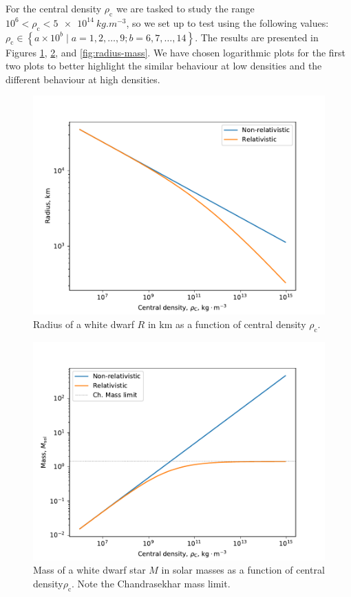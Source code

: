 \documentclass[]{article}
\newcommand{\rhoCentre}{\rho_\mathrm{c}}
\begin{document}
	For the central density $\rhoCentre$ we are tasked to study the range $10^6 < \rhoCentre < \SI{5e14}{kg.m^{-3}}$, so we set up to test using the following values: $\rhoCentre \in \left\{a \times 10^b \mid a = 1,2,\ldots,9 ; b = 6,7, \ldots, 14\right\}$. The results are presented in Figures \ref{fig:radius-rhoC}, \ref{fig:mass-rhoC}, and \ref{fig:radius-mass}. We have chosen logarithmic plots for the first two plots to better highlight the similar behaviour at low densities and the different behaviour at high densities.
	\begin{figure}[!htb]
		\centering
		\includegraphics[height=0.3\textheight]{figures/radius-rhoC.pdf}
		\caption{Radius of a white dwarf $R$ in km as a function of central density $\rhoCentre$.\label{fig:radius-rhoC}}
	\end{figure}
	\begin{figure}[!htb]
		\centering
		\includegraphics[height=0.3\textheight]{figures/mass-rhoC.pdf}
		\caption{Mass of a white dwarf star $M$ in solar masses as a function of central density$\rhoCentre$. Note the Chandrasekhar mass limit.\label{fig:mass-rhoC}}
	\end{figure}
\end{document}
